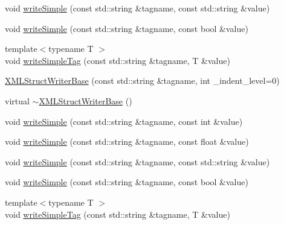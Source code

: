 \begin{DoxyCompactItemize}
\item 
void \mbox{\hyperlink{classXMLStructWriterAPI_1_1XMLStructWriterBase_a32cd25bd69861a05001bb31c5ad9eefe}{write\+Simple}} (const std\+::string \&tagname, const std\+::string \&value)
\item 
void \mbox{\hyperlink{classXMLStructWriterAPI_1_1XMLStructWriterBase_a8e5e47c565c73791739d298b697d66f8}{write\+Simple}} (const std\+::string \&tagname, const bool \&value)
\item 
{\footnotesize template$<$typename T $>$ }\\void \mbox{\hyperlink{classXMLStructWriterAPI_1_1XMLStructWriterBase_a049c80e79c8f64d2b6b0221c01392d37}{write\+Simple\+Tag}} (const std\+::string \&tagname, T \&value)
\item 
\mbox{\hyperlink{classXMLStructWriterAPI_1_1XMLStructWriterBase_a502490c6d71df950eb4ffa61388c12e9}{X\+M\+L\+Struct\+Writer\+Base}} (const std\+::string \&tagname, int \+\_\+indent\+\_\+level=0)
\item 
virtual \mbox{\hyperlink{classXMLStructWriterAPI_1_1XMLStructWriterBase_aef1865b8b39ea8001e84d05a06be0129}{$\sim$\+X\+M\+L\+Struct\+Writer\+Base}} ()
\item 
void \mbox{\hyperlink{classXMLStructWriterAPI_1_1XMLStructWriterBase_a53065b03f0749669f9ed62f6e0875fa4}{write\+Simple}} (const std\+::string \&tagname, const int \&value)
\item 
void \mbox{\hyperlink{classXMLStructWriterAPI_1_1XMLStructWriterBase_a521a493ac0656d33d06f4bb74286de6c}{write\+Simple}} (const std\+::string \&tagname, const float \&value)
\item 
void \mbox{\hyperlink{classXMLStructWriterAPI_1_1XMLStructWriterBase_a32cd25bd69861a05001bb31c5ad9eefe}{write\+Simple}} (const std\+::string \&tagname, const std\+::string \&value)
\item 
void \mbox{\hyperlink{classXMLStructWriterAPI_1_1XMLStructWriterBase_a8e5e47c565c73791739d298b697d66f8}{write\+Simple}} (const std\+::string \&tagname, const bool \&value)
\item 
{\footnotesize template$<$typename T $>$ }\\void \mbox{\hyperlink{classXMLStructWriterAPI_1_1XMLStructWriterBase_a049c80e79c8f64d2b6b0221c01392d37}{write\+Simple\+Tag}} (const std\+::string \&tagname, T \&value)
\end{DoxyCompactItemize}
